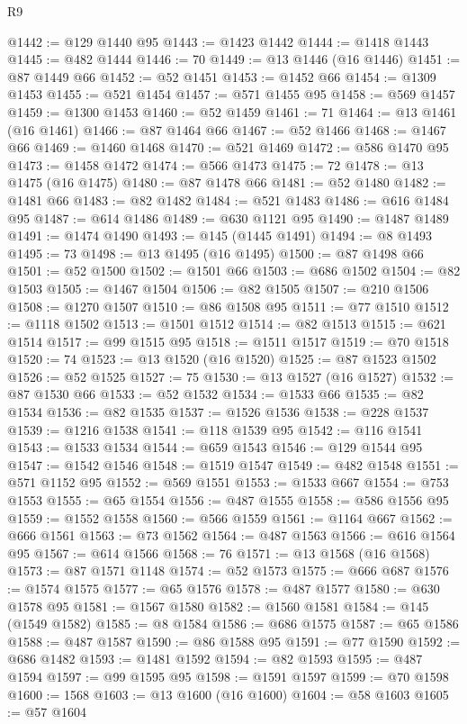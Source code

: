 \begin{lexlean}{R9}
\begin{coremodule}
@1442 := @129 @1440 @95
@1443 := @1423 @1442
@1444 := @1418 @1443
@1445 := @482 @1444
@1446 := 70
@1449 := @13 @1446 (@16 @1446)
@1451 := @87 @1449 @66
@1452 := @52 @1451
@1453 := @1452 @66
@1454 := @1309 @1453
@1455 := @521 @1454
@1457 := @571 @1455 @95
@1458 := @569 @1457
@1459 := @1300 @1453
@1460 := @52 @1459
@1461 := 71
@1464 := @13 @1461 (@16 @1461)
@1466 := @87 @1464 @66
@1467 := @52 @1466
@1468 := @1467 @66
@1469 := @1460 @1468
@1470 := @521 @1469
@1472 := @586 @1470 @95
@1473 := @1458 @1472
@1474 := @566 @1473
@1475 := 72
@1478 := @13 @1475 (@16 @1475)
@1480 := @87 @1478 @66
@1481 := @52 @1480
@1482 := @1481 @66
@1483 := @82 @1482
@1484 := @521 @1483
@1486 := @616 @1484 @95
@1487 := @614 @1486
@1489 := @630 @1121 @95
@1490 := @1487 @1489
@1491 := @1474 @1490
@1493 := @145 (@1445 @1491)
@1494 := @8 @1493
@1495 := 73
@1498 := @13 @1495 (@16 @1495)
@1500 := @87 @1498 @66
@1501 := @52 @1500
@1502 := @1501 @66
@1503 := @686 @1502
@1504 := @82 @1503
@1505 := @1467 @1504
@1506 := @82 @1505
@1507 := @210 @1506
@1508 := @1270 @1507
@1510 := @86 @1508 @95
@1511 := @77 @1510
@1512 := @1118 @1502
@1513 := @1501 @1512
@1514 := @82 @1513
@1515 := @621 @1514
@1517 := @99 @1515 @95
@1518 := @1511 @1517
@1519 := @70 @1518
@1520 := 74
@1523 := @13 @1520 (@16 @1520)
@1525 := @87 @1523 @1502
@1526 := @52 @1525
@1527 := 75
@1530 := @13 @1527 (@16 @1527)
@1532 := @87 @1530 @66
@1533 := @52 @1532
@1534 := @1533 @66
@1535 := @82 @1534
@1536 := @82 @1535
@1537 := @1526 @1536
@1538 := @228 @1537
@1539 := @1216 @1538
@1541 := @118 @1539 @95
@1542 := @116 @1541
@1543 := @1533 @1534
@1544 := @659 @1543
@1546 := @129 @1544 @95
@1547 := @1542 @1546
@1548 := @1519 @1547
@1549 := @482 @1548
@1551 := @571 @1152 @95
@1552 := @569 @1551
@1553 := @1533 @667
@1554 := @753 @1553
@1555 := @65 @1554
@1556 := @487 @1555
@1558 := @586 @1556 @95
@1559 := @1552 @1558
@1560 := @566 @1559
@1561 := @1164 @667
@1562 := @666 @1561
@1563 := @73 @1562
@1564 := @487 @1563
@1566 := @616 @1564 @95
@1567 := @614 @1566
@1568 := 76
@1571 := @13 @1568 (@16 @1568)
@1573 := @87 @1571 @1148
@1574 := @52 @1573
@1575 := @666 @687
@1576 := @1574 @1575
@1577 := @65 @1576
@1578 := @487 @1577
@1580 := @630 @1578 @95
@1581 := @1567 @1580
@1582 := @1560 @1581
@1584 := @145 (@1549 @1582)
@1585 := @8 @1584
@1586 := @686 @1575
@1587 := @65 @1586
@1588 := @487 @1587
@1590 := @86 @1588 @95
@1591 := @77 @1590
@1592 := @686 @1482
@1593 := @1481 @1592
@1594 := @82 @1593
@1595 := @487 @1594
@1597 := @99 @1595 @95
@1598 := @1591 @1597
@1599 := @70 @1598
@1600 := 1568
@1603 := @13 @1600 (@16 @1600)
@1604 := @58 @1603
@1605 := @57 @1604

\end{coremodule}
\end{lexlean}
